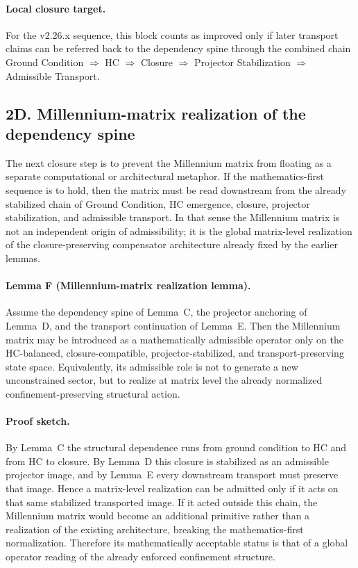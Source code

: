 \paragraph{Local closure target.}
For the v2.26.x sequence, this block counts as improved only if later transport
claims can be referred back to the dependency spine through the combined chain
Ground Condition $\Rightarrow$ HC $\Rightarrow$ Closure $\Rightarrow$
Projector Stabilization $\Rightarrow$ Admissible Transport.


\subsection*{2D. Millennium-matrix realization of the dependency spine}
The next closure step is to prevent the Millennium matrix from floating as a
separate computational or architectural metaphor. If the mathematics-first
sequence is to hold, then the matrix must be read downstream from the already
stabilized chain of Ground Condition, HC emergence, closure, projector
stabilization, and admissible transport. In that sense the Millennium matrix is
not an independent origin of admissibility; it is the global matrix-level
realization of the closure-preserving compensator architecture already fixed by
the earlier lemmas.

\paragraph{Lemma F (Millennium-matrix realization lemma).}
Assume the dependency spine of Lemma~C, the projector anchoring of Lemma~D, and
the transport continuation of Lemma~E. Then the Millennium matrix may be
introduced as a mathematically admissible operator only on the HC-balanced,
closure-compatible, projector-stabilized, and transport-preserving state space.
Equivalently, its admissible role is not to generate a new unconstrained sector,
but to realize at matrix level the already normalized confinement-preserving
structural action.

\paragraph{Proof sketch.}
By Lemma~C the structural dependence runs from ground condition to HC and from
HC to closure. By Lemma~D this closure is stabilized as an admissible projector
image, and by Lemma~E every downstream transport must preserve that image.
Hence a matrix-level realization can be admitted only if it acts on that same
stabilized transported image. If it acted outside this chain, the Millennium
matrix would become an additional primitive rather than a realization of the
existing architecture, breaking the mathematics-first normalization. Therefore
its mathematically acceptable status is that of a global operator reading of the
already enforced confinement structure.

